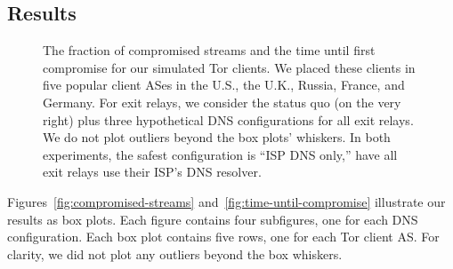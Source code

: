 \subsection{Results}

\begin{figure}[t]
\centering
{}
\caption{The fraction of compromised streams and the time until first compromise
for our simulated Tor clients.  We placed these clients in five popular client
ASes in the U.S., the U.K., Russia, France, and Germany.  For exit relays, we
consider the status quo (on the very right) plus three hypothetical DNS
configurations for all exit relays.  We do not plot outliers beyond the box
plots' whiskers.  In both experiments, the safest configuration is ``ISP DNS
only,'' \ie have all exit relays use their ISP's DNS resolver.}
\end{figure}

Figures~\ref{fig:compromised-streams} and~\ref{fig:time-until-compromise}
illustrate our results as box plots.  Each figure contains four subfigures, one
for each DNS configuration.  Each box plot contains five rows, one for each Tor
client AS.  For clarity, we did not plot any outliers beyond the box whiskers.

